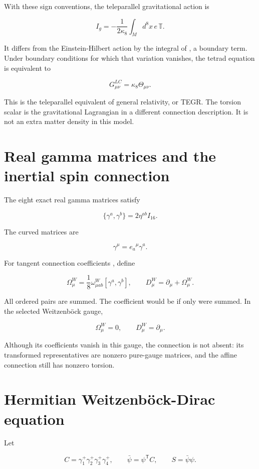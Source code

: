 \documentclass[11pt]{article}
\begin{document}
With these sign conventions, the teleparallel gravitational action is

\[
I_g=-\frac{1}{2\kappa_8}\int_M d^8x\,e\,\mathbb T.
\]

It differs from the Einstein-Hilbert action by the integral of \texttt{}, a boundary term. Under boundary conditions for which that variation vanishes, the tetrad equation is equivalent to

\[
G^{LC}_{\mu\nu}=\kappa_8\Theta_{\mu\nu}.
\]

This is the teleparallel equivalent of general relativity, or TEGR. The torsion scalar is the gravitational Lagrangian in a different connection description. It is not an extra matter density in this model.

\section{Real gamma matrices and the inertial spin connection}

The eight exact real \texttt{} gamma matrices satisfy

\[
\{\gamma^a,\gamma^b\}=2\eta^{ab}I_{16}.
\]

The curved matrices are

\[
\gamma^\mu=e_a{}^\mu\gamma^a.
\]

For tangent connection coefficients \texttt{}, define

\[
\boxed{
\Omega^W_\mu
=\frac18\omega^W_{\mu ab}[\gamma^a,\gamma^b],
\qquad
D^W_\mu=\partial_\mu+\Omega^W_\mu.}
\]

All ordered pairs \texttt{} are summed. The coefficient would be \texttt{} if only \texttt{} were summed. In the selected Weitzenböck gauge,

\[
\Omega^W_\mu=0,
\qquad
D^W_\mu=\partial_\mu.
\]

Although its coefficients vanish in this gauge, the connection is not absent: its transformed representatives are nonzero pure-gauge matrices, and the affine connection still has nonzero torsion.

\section{Hermitian Weitzenböck-Dirac equation}

Let

\[
C=\gamma_1^+\gamma_2^+\gamma_3^+\gamma_4^+,
\qquad
\bar\psi=\psi^{\mathsf T}C,
\qquad
S=\bar\psi\psi.
\]
\end{document}
